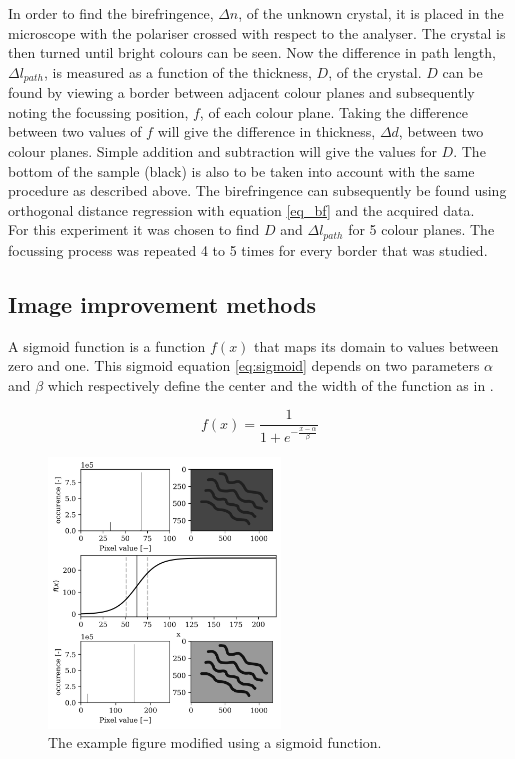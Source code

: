In order to find the birefringence, $\Delta n$, of the unknown crystal, it is placed in the microscope with the polariser crossed with respect to the analyser. The crystal is then turned until bright colours can be seen. Now the difference in path length, $\Delta l_{path}$, is measured as a function of the thickness, $D$, of the crystal. $D$ can be found by viewing a border between adjacent colour planes and subsequently noting the focussing position, $f$, of each colour plane. Taking the difference between two values of $f$ will give the difference in thickness, $\Delta d$, between two colour planes. Simple addition and subtraction will give the values for $D$. The bottom of the sample (black) is also to be taken into account with the same procedure as described above. The birefringence can subsequently be found using orthogonal distance regression with equation \ref{eq_bf} and the acquired data.\\
For this experiment it was chosen to find $D$ and $\Delta l_{path}$ for 5 colour planes. The focussing process was repeated 4 to 5 times for every border that was studied.

\subsection{Image improvement methods}
\label{section:imageimprovement}

A sigmoid function is a function $f(x)$ that maps its domain to values between zero and one. This sigmoid equation \ref{eq:sigmoid} depends on two parameters $\alpha$ and $\beta$ which respectively define the center and the width of the function as in \cite{article_sigmoid}.

\begin{equation}
    f(x) = \frac{1}{1+e^{-\frac{x-\alpha}{\beta}}}
    \label{eq:sigmoid}
\end{equation}

\begin{figure}
    \centering
    \includegraphics[width=0.55\textwidth,keepaspectratio]{afbeeldingen/sigmoid_explained.png}
    \caption{The example figure modified using a sigmoid function.}
    \label{fig:sigmoid}
\end{figure}

